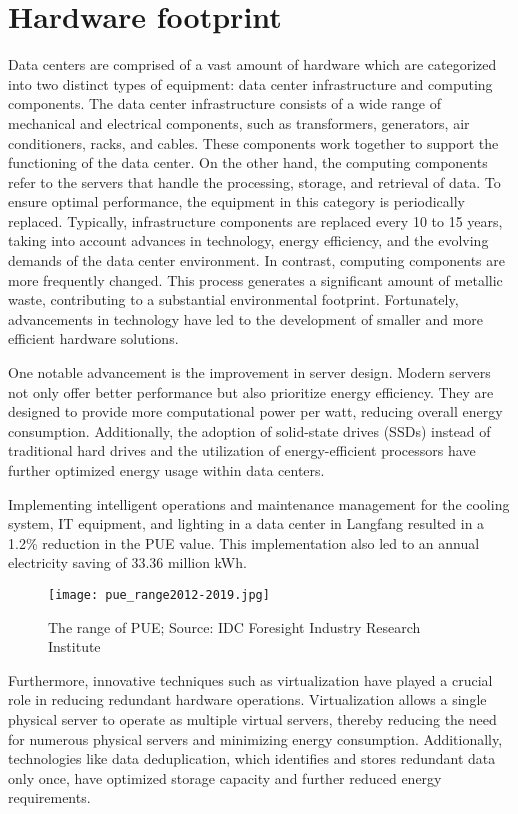 \documentclass[
  a4paper,  %
  twoside,  %
  bibliography=totoc,
  headsepline,
  cleardoublepage=empty,
  parskip=half,
  draft=false
]{scrbook}
\begin{document}
\chapter{Hardware footprint}
Data centers are comprised of a vast amount of hardware which are categorized into two distinct types of equipment: data center infrastructure and computing components. The data center infrastructure consists of a wide range of mechanical and electrical components, such as transformers, generators, air conditioners, racks, and cables. These components work together to support the functioning of the data center. On the other hand, the computing components refer to the servers that handle the processing, storage, and retrieval of data. To ensure optimal performance, the equipment in this category is periodically replaced. Typically, infrastructure components are replaced every 10 to 15 years, taking into account advances in technology, energy efficiency, and the evolving demands of the data center environment.\cite{samaye2024energy} In
contrast, computing components are more frequently changed. This process generates a significant amount of metallic waste, contributing to a substantial environmental footprint. Fortunately, advancements in technology have led to the development of smaller and more efficient hardware solutions.

One notable advancement is the improvement in server design. Modern servers not only offer better performance but also prioritize energy efficiency. They are designed to provide more computational power per watt, reducing overall energy consumption. Additionally, the adoption of solid-state drives (SSDs) instead of traditional hard drives and the utilization of energy-efficient processors have further optimized energy usage within data centers.

Implementing intelligent operations and maintenance management for the cooling system, IT equipment, and lighting in a data center in Langfang resulted in a 1.2\% reduction in the PUE value. This implementation also led to an annual electricity saving of 33.36 million kWh\cite{li2023china}.

\begin{figure}
	\centering
	\texttt{[image: pue\_range2012-2019.jpg]}
	\caption{The range of PUE; Source: IDC Foresight Industry Research Institute}
\end{figure}

Furthermore, innovative techniques such as virtualization have played a crucial role in reducing redundant hardware operations. Virtualization allows a single physical server to operate as multiple virtual servers, thereby reducing the need for numerous physical servers and minimizing energy consumption. Additionally, technologies like data deduplication, which identifies and stores redundant data only once, have optimized storage capacity and further reduced energy requirements.
\end{document}
